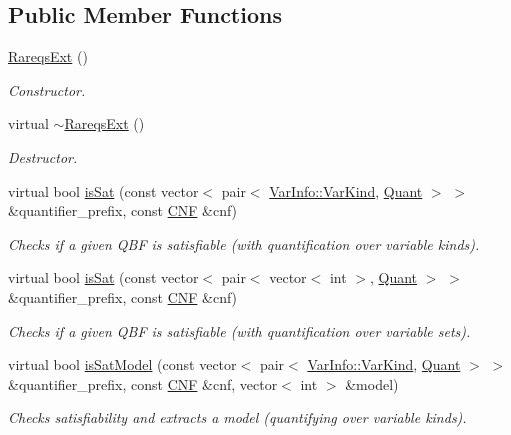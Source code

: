 \subsection*{Public Member Functions}
\begin{DoxyCompactItemize}
\item 
\hyperlink{classRareqsExt_a421dfdcbc382e981ac379208a61e8163}{Rareqs\-Ext} ()
\begin{DoxyCompactList}\small\item\em Constructor. \end{DoxyCompactList}\item 
virtual \hyperlink{classRareqsExt_ae04b1033390f2bfdcdac76d842c6f365}{$\sim$\-Rareqs\-Ext} ()
\begin{DoxyCompactList}\small\item\em Destructor. \end{DoxyCompactList}\item 
virtual bool \hyperlink{classExtQBFSolver_abec25b97170b79b42b85d1d4ec825a39}{is\-Sat} (const vector$<$ pair$<$ \hyperlink{classVarInfo_a64d1da76cf84fe674e5fef9764ef11cf}{Var\-Info\-::\-Var\-Kind}, \hyperlink{classQBFSolver_ac091e263cb55286cc07b2451bcf4d3c7}{Quant} $>$ $>$ \&quantifier\-\_\-prefix, const \hyperlink{classCNF}{C\-N\-F} \&cnf)
\begin{DoxyCompactList}\small\item\em Checks if a given Q\-B\-F is satisfiable (with quantification over variable kinds). \end{DoxyCompactList}\item 
virtual bool \hyperlink{classExtQBFSolver_adc1bacec3307200dd90b260789e4c808}{is\-Sat} (const vector$<$ pair$<$ vector$<$ int $>$, \hyperlink{classQBFSolver_ac091e263cb55286cc07b2451bcf4d3c7}{Quant} $>$ $>$ \&quantifier\-\_\-prefix, const \hyperlink{classCNF}{C\-N\-F} \&cnf)
\begin{DoxyCompactList}\small\item\em Checks if a given Q\-B\-F is satisfiable (with quantification over variable sets). \end{DoxyCompactList}\item 
virtual bool \hyperlink{classExtQBFSolver_ad66c53343ce9c03eea6e4b5e7753f1b3}{is\-Sat\-Model} (const vector$<$ pair$<$ \hyperlink{classVarInfo_a64d1da76cf84fe674e5fef9764ef11cf}{Var\-Info\-::\-Var\-Kind}, \hyperlink{classQBFSolver_ac091e263cb55286cc07b2451bcf4d3c7}{Quant} $>$ $>$ \&quantifier\-\_\-prefix, const \hyperlink{classCNF}{C\-N\-F} \&cnf, vector$<$ int $>$ \&model)
\begin{DoxyCompactList}\small\item\em Checks satisfiability and extracts a model (quantifying over variable kinds). \end{DoxyCompactList}\item 

\end{DoxyCompactItemize}
